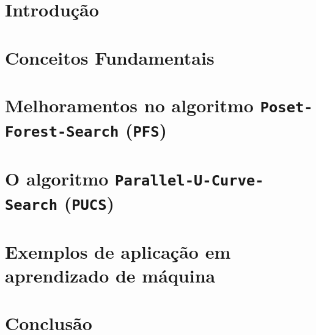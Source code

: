 \documentclass[12pt, twoside]{report}
\newcommand{\algname}[1]{\texttt{#1}}
\numberwithin{mydefinition}{section}
\numberwithin{mytheorem}{section}
\numberwithin{mylemma}{section}
\numberwithin{corollary}{section}
\begin{document}
\tableofcontents

\clearpage
{} 

\nocite{*}
\chapter{Introdução}
\label{chap:intro}


\chapter{Conceitos Fundamentais}
\label{chap:fundamental_concepts}


\chapter{Melhoramentos no algoritmo \algname{Poset-Forest-Search} (\algname{PFS})}
\label{chap:forests}


\chapter{O algoritmo \algname{Parallel-U-Curve-Search} (\algname{PUCS})}
\label{chap:pucs}


\chapter{Exemplos de aplicação em aprendizado de máquina}
\label{chap:uci}


\chapter{Conclusão}
\label{chap:conclusion}


\newpage
\printbibliography
\end{document}
